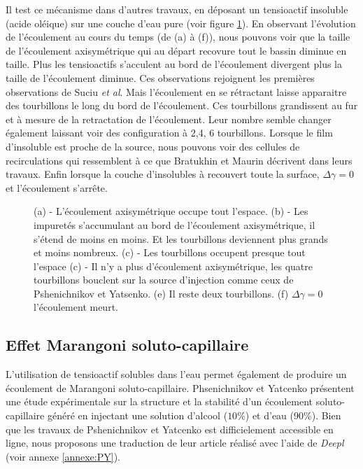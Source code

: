   
  Il test ce mécanisme dans d'autres travaux, en déposant un tensioactif insoluble (acide oléique) sur une couche d'eau pure \cite{Mizev2013,Mizev2014} (voir figure \ref{fig:Mizev2014}). En observant l'évolution de l'écoulement au cours du temps (de (a) à (f)), nous pouvons voir que la taille de l'écoulement axisymétrique qui au départ recovure tout le bassin diminue en taille. Plus les tensioactifs s'acculent au bord de l'écoulement divergent plus la taille de l'écoulement diminue. Ces observations rejoignent les premières observations de Suciu \textit{et al}. Mais l'écoulement en se rétractant laisse apparaitre des tourbillons le long du bord de l'écoulement. Ces tourbillons grandissent au fur et à mesure de la retractation de l'écoulement. Leur nombre semble changer également laissant voir des configuration à 2,4, 6 tourbillons. Lorsque le film d'insoluble est proche de la source, nous pouvons voir des cellules de recirculations qui ressemblent à ce que Bratukhin et Maurin décrivent dans leurs travaux. Enfin lorsque la couche d'insolubles à recouvert toute la surface, $\Delta \gamma = 0$ et l'écoulement s'arrête.
  \begin{figure}
    \centering
    \resizebox{.7\textwidth}{!}{}
    \caption{(a) - L'écoulement axisymétrique occupe tout l'espace. (b) - Les impuretés s'accumulant au bord de l'écoulement axisymétrique, il s'étend de moins en moins. Et les tourbillons deviennent plus grands et moins nombreux. (c) - Les tourbillons occupent presque tout l'espace (c) - Il n'y a plus d'écoulement axisymétrique, les quatre tourbillons bouclent sur la source d'injection comme ceux de Pshenichnikov et Yatsenko. (e) Il reste deux tourbillons. (f) $\Delta\gamma = 0$ l'écoulement meurt.}
    \label{fig:Mizev2014}
  \end{figure}
  
\subsection{Effet Marangoni soluto-capillaire}
  L'utilisation de tensioactif solubles dans l'eau permet également de produire un écoulement de Marangoni soluto-capillaire. Phsenichnikov et Yatcenko \cite{Pshenichnikov1974} présentent une étude expérimentale sur la structure et la stabilité d'un écoulement soluto-capillaire généré en injectant une solution d'alcool ($10\%$) et d'eau ($90\%$). Bien que les travaux de Pshenichnikov et Yatcenko est difficielement accessible en ligne, nous proposons une traduction de leur article réalisé avec l'aide de \textit{Deepl} (voir annexe \ref{annexe:PY}). 
  
